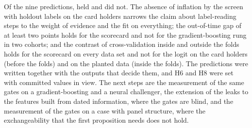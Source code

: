 Of the nine predictions,  held and  did not. The absence of inflation by the screen with holdout labels on the card holders narrows the claim about label-reading steps to the weight of evidence and the fit on everything; the out-of-time gap of at least two points holds for the scorecard and not for the gradient-boosting rung in two cohorts; and the contrast of cross-validation inside and outside the folds holds for the scorecard on every data set and not for the logit on the card holders (before the folds) and on the planted data (inside the folds). The predictions were written together with the outputs that decide them, and H6 and H8 were set with committed values in view. The next steps are the measurement of the same gates on a gradient-boosting and a neural challenger, the extension of the leaks to the features built from dated information, where the gates are blind, and the measurement of the gates on a case with panel structure, where the exchangeability that the first proposition needs does not hold.
